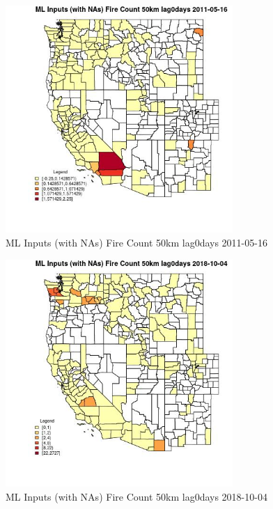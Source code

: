\begin{figure} 
\centering  
\includegraphics[width=0.77\textwidth]{Code_Outputs/Report_ML_input_PM25_Step4_part_f_de_duplicated_aves_prioritize_24hr_obswNAs_CountyFire_Count_50km_lag0daysMean2011-05-16.jpg} 
\caption{\label{fig:Report_ML_input_PM25_Step4_part_f_de_duplicated_aves_prioritize_24hr_obswNAsCountyFire_Count_50km_lag0daysMean2011-05-16}ML Inputs (with NAs) Fire Count 50km lag0days 2011-05-16} 
\end{figure} 
 

\clearpage 

\begin{figure} 
\centering  
\includegraphics[width=0.77\textwidth]{Code_Outputs/Report_ML_input_PM25_Step4_part_f_de_duplicated_aves_prioritize_24hr_obswNAs_CountyFire_Count_50km_lag0daysMean2018-10-04.jpg} 
\caption{\label{fig:Report_ML_input_PM25_Step4_part_f_de_duplicated_aves_prioritize_24hr_obswNAsCountyFire_Count_50km_lag0daysMean2018-10-04}ML Inputs (with NAs) Fire Count 50km lag0days 2018-10-04} 
\end{figure} 
 


